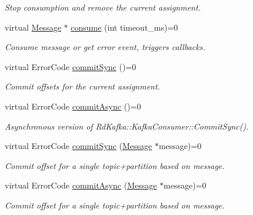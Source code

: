 \begin{DoxyCompactItemize}
\begin{DoxyCompactList}\small\item\em Stop consumption and remove the current assignment. \item\end{DoxyCompactList}\item 
virtual \hyperlink{classRdKafka_1_1Message}{Message} $\ast$ \hyperlink{classRdKafka_1_1KafkaConsumer_a7dc106f1c3b99767a0930a9cf8cabf84}{consume} (int timeout\_\-ms)=0
\begin{DoxyCompactList}\small\item\em Consume message or get error event, triggers callbacks. \item\end{DoxyCompactList}\item 
virtual ErrorCode \hyperlink{classRdKafka_1_1KafkaConsumer_a1c421bf2b44509704ad3d9e785c5b15c}{commitSync} ()=0
\begin{DoxyCompactList}\small\item\em Commit offsets for the current assignment. \item\end{DoxyCompactList}\item 
virtual ErrorCode \hyperlink{classRdKafka_1_1KafkaConsumer_a6d68b1b8d21dc26499938cb6e529f928}{commitAsync} ()=0
\begin{DoxyCompactList}\small\item\em Asynchronous version of RdKafka::KafkaConsumer::CommitSync(). \item\end{DoxyCompactList}\item 
virtual ErrorCode \hyperlink{classRdKafka_1_1KafkaConsumer_ac5d1b4fcadea749b774ab1cdd62de2d1}{commitSync} (\hyperlink{classRdKafka_1_1Message}{Message} $\ast$message)=0
\begin{DoxyCompactList}\small\item\em Commit offset for a single topic+partition based on {\ttfamily message}. \item\end{DoxyCompactList}\item 
virtual ErrorCode \hyperlink{classRdKafka_1_1KafkaConsumer_a278db6d20ebcaf501af9487c0957d57f}{commitAsync} (\hyperlink{classRdKafka_1_1Message}{Message} $\ast$message)=0
\begin{DoxyCompactList}\small\item\em Commit offset for a single topic+partition based on {\ttfamily message}. \item\end{DoxyCompactList}\item 

\end{DoxyCompactItemize}
